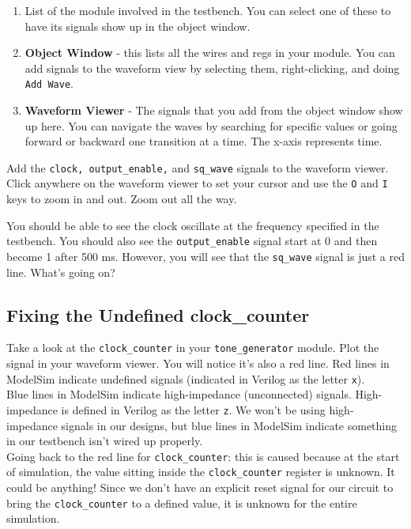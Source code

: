 \documentclass[11pt]{article}
\begin{document}
\begin{enumerate}
	\item List of the module involved in the testbench. You can select one of these to have its signals show up in the object window.
	\item \textbf{Object Window} - this lists all the wires and regs in your module. You can add signals to the waveform view by selecting them, right-clicking, and doing \verb|Add Wave|.
	\item \textbf{Waveform Viewer} - The signals that you add from the object window show up here. You can navigate the waves by searching for specific values or going forward or backward one transition at a time. The x-axis represents time.
\end{enumerate}

Add the \verb|clock, output_enable,| and \verb|sq_wave| signals to the waveform viewer. Click anywhere on the waveform viewer to set your cursor and use the \verb|O| and \verb|I| keys to zoom in and out. Zoom out all the way.

You should be able to see the clock oscillate at the frequency specified in the testbench. You should also see the \verb|output_enable| signal start at 0 and then become 1 after 500 ms. However, you will see that the \verb|sq_wave| signal is just a red line. What's going on?

\subsection{Fixing the Undefined clock\_counter}

Take a look at the \verb|clock_counter| in your \verb|tone_generator| module. Plot the signal in your waveform viewer. You will notice it's also a red line. Red lines in ModelSim indicate undefined signals (indicated in Verilog as the letter \verb|x|). \\

Blue lines in ModelSim indicate high-impedance (unconnected) signals. High-impedance is defined in Verilog as the letter \verb|z|. We won't be using high-impedance signals in our designs, but blue lines in ModelSim indicate something in our testbench isn't wired up properly.\\

Going back to the red line for \verb|clock_counter|: this is caused because at the start of simulation, the value sitting inside the \verb|clock_counter| register is unknown. It could be anything! Since we don't have an explicit reset signal for our circuit to bring the \verb|clock_counter| to a defined value, it is unknown for the entire simulation.\\
\end{document}
